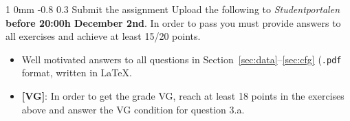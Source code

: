 \documentclass[11pt]{article}
\makeatletter
\newcommand{\newsec}[2]{\section{#1}\label{sec:#2}\noindent}
\renewcommand{\section}{\@startsection
{section}%
{1}%
{0mm}%
{-0.8\baselineskip}%
{0.3\baselineskip}%
{\bfseries\large}}%
\makeatother
\begin{document}
\newsec{Submit the assignment}{sub}%
Upload the following to {\it Studentportalen}
\textbf{before 20:00h December 2nd}. In order to pass you must provide
answers to all exercises and achieve at least 15/20 points.
\begin{itemize}[noitemsep,topsep=0.2cm]
\item Well motivated answers to all questions in
  Section~\ref{sec:data}--\ref{sec:cfg} (\texttt{.pdf} format, written
  in \LaTeX.
\item \textbf{[VG]}: In order to get the grade VG, reach at least 18
  points in the exercises above and answer the VG condition for question                     
  3.a.
\end{itemize}
\end{document}
